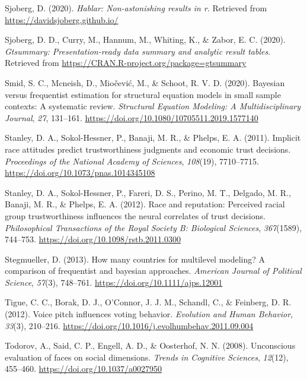 \documentclass[
  english,
  man, noextraspace,floatsintext]{apa6}
\newlength{\cslhangindent}
\newenvironment{cslreferences}%
  {\setlength{\parindent}{0pt}%
  \everypar{\setlength{\hangindent}{\cslhangindent}}\ignorespaces}%
  {\par}
\begin{document}
\begin{cslreferences}
\leavevmode\hypertarget{ref-R-hablar}{}%
Sjoberg, D. (2020). \emph{Hablar: Non-astonishing results in r}. Retrieved from \url{https://davidsjoberg.github.io/}

\leavevmode\hypertarget{ref-R-gtsummary}{}%
Sjoberg, D. D., Curry, M., Hannum, M., Whiting, K., \& Zabor, E. C. (2020). \emph{Gtsummary: Presentation-ready data summary and analytic result tables}. Retrieved from \url{https://CRAN.R-project.org/package=gtsummary}

\leavevmode\hypertarget{ref-Smid2020}{}%
Smid, S. C., Mcneish, D., Miočević, M., \& Schoot, R. V. D. (2020). Bayesian versus frequentist estimation for structural equation models in small sample contexts: A systematic review. \emph{Structural Equation Modeling: A Multidisciplinary Journal}, \emph{27}, 131--161. \url{https://doi.org/10.1080/10705511.2019.1577140}

\leavevmode\hypertarget{ref-Stanley2011}{}%
Stanley, D. A., Sokol-Hessner, P., Banaji, M. R., \& Phelps, E. A. (2011). Implicit race attitudes predict trustworthiness judgments and economic trust decisions. \emph{Proceedings of the National Academy of Sciences}, \emph{108}(19), 7710--7715. \url{https://doi.org/10.1073/pnas.1014345108}

\leavevmode\hypertarget{ref-Stanley2012}{}%
Stanley, D. A., Sokol-Hessner, P., Fareri, D. S., Perino, M. T., Delgado, M. R., Banaji, M. R., \& Phelps, E. A. (2012). Race and reputation: Perceived racial group trustworthiness influences the neural correlates of trust decisions. \emph{Philosophical Transactions of the Royal Society B: Biological Sciences}, \emph{367}(1589), 744--753. \url{https://doi.org/10.1098/rstb.2011.0300}

\leavevmode\hypertarget{ref-Stegmueller2013}{}%
Stegmueller, D. (2013). How many countries for multilevel modeling? A comparison of frequentist and bayesian approaches. \emph{American Journal of Political Science}, \emph{57}(3), 748--761. \url{https://doi.org/10.1111/ajps.12001}

\leavevmode\hypertarget{ref-Tigue2012}{}%
Tigue, C. C., Borak, D. J., O'Connor, J. J. M., Schandl, C., \& Feinberg, D. R. (2012). Voice pitch influences voting behavior. \emph{Evolution and Human Behavior}, \emph{33}(3), 210--216. \url{https://doi.org/10.1016/j.evolhumbehav.2011.09.004}

\leavevmode\hypertarget{ref-Todorov2008}{}%
Todorov, A., Said, C. P., Engell, A. D., \& Oosterhof, N. N. (2008). Unconscious evaluation of faces on social dimensions. \emph{Trends in Cognitive Sciences}, \emph{12}(12), 455--460. \url{https://doi.org/10.1037/a0027950}


\end{cslreferences}
\end{document}
